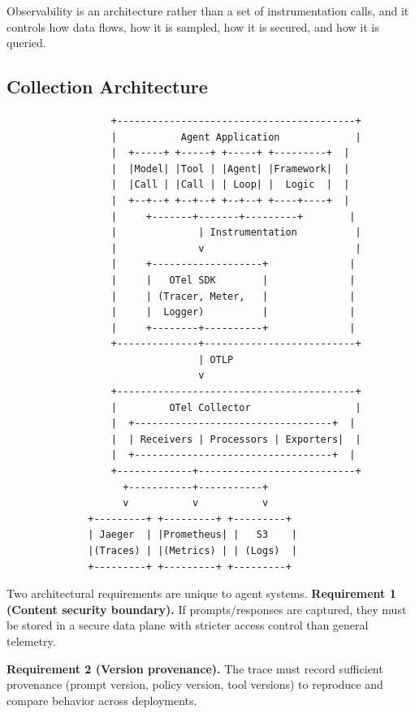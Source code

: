 Observability is an architecture rather than a set of instrumentation calls, and it controls how data flows, how it is sampled, how it is secured, and how it is queried.

\subsection{Collection Architecture}

{\footnotesize
\begin{verbatim}
                  +-----------------------------------------+
                  |           Agent Application             |
                  |  +-----+ +-----+ +-----+ +---------+  |
                  |  |Model| |Tool | |Agent| |Framework|  |
                  |  |Call | |Call | | Loop| |  Logic  |  |
                  |  +--+--+ +--+--+ +--+--+ +----+----+  |
                  |     +-------+-------+---------+        |
                  |              | Instrumentation          |
                  |              v                          |
                  |     +-------------------+              |
                  |     |   OTel SDK        |              |
                  |     | (Tracer, Meter,   |              |
                  |     |  Logger)          |              |
                  |     +--------+----------+              |
                  +--------------+--------------------------+
                                 | OTLP
                                 v
                  +-----------------------------------------+
                  |         OTel Collector                  |
                  |  +----------------------------------+  |
                  |  | Receivers | Processors | Exporters|  |
                  |  +----------------------------------+  |
                  +-------------+---------------------------+
                    +-----------+-----------+
                    v           v           v
              +---------+ +---------+ +---------+
              | Jaeger  | |Prometheus| |   S3    |
              |(Traces) | |(Metrics) | | (Logs)  |
              +---------+ +---------+ +---------+
\end{verbatim}
}

Two architectural requirements are unique to agent systems. \textbf{Requirement 1 (Content security boundary).} If prompts/responses are captured, they must be stored in a secure data plane with stricter access control than general telemetry.

\textbf{Requirement 2 (Version provenance).} The trace must record sufficient provenance (prompt version, policy version, tool versions) to reproduce and compare behavior across deployments.

